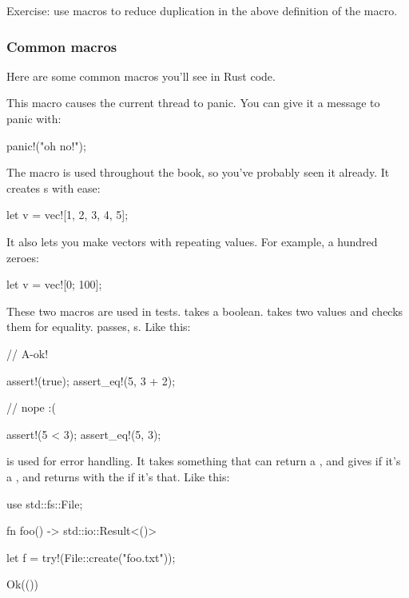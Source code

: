 Exercise: use macros to reduce duplication in the above definition of the  macro.

\subsubsection*{Common macros}

Here are some common macros you'll see in Rust code.


This macro causes the current thread to panic. You can give it a message to panic with:

\begin{rustc}
panic!("oh no!");
\end{rustc}


The  macro is used throughout the book, so you've probably seen it already. It creates s with ease:

\begin{rustc}
let v = vec![1, 2, 3, 4, 5];
\end{rustc}

It also lets you make vectors with repeating values. For example, a hundred zeroes:

\begin{rustc}
let v = vec![0; 100];
\end{rustc}


These two macros are used in tests.  takes a boolean.  takes two values and checks them for equality. 
 passes,  \panic s. Like this:

\begin{rustc}
// A-ok!

assert!(true);
assert_eq!(5, 3 + 2);

// nope :(

assert!(5 < 3);
assert_eq!(5, 3);
\end{rustc}


 is used for error handling. It takes something that can return a , and gives  if it's a ,
and returns with the  if it's that. Like this:

\begin{rustc}
use std::fs::File;

fn foo() -> std::io::Result<()> {
    let f = try!(File::create("foo.txt"));

    Ok(())
}
\end{rustc}

